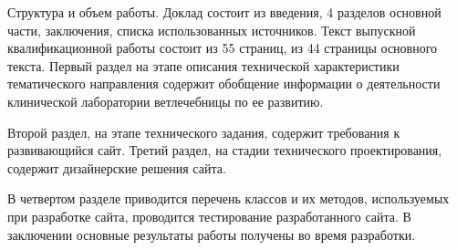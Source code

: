 Структура и объем работы. Доклад состоит из введения, 4 разделов основной части, заключения, списка использованных источников. Текст выпускной квалификационной работы состоит из 55 страниц, из 44 страницы основного текста.
Первый раздел на этапе описания технической характеристики тематического направления содержит обобщение информации о деятельности клинической лаборатории ветлечебницы по ее развитию.

Второй раздел, на этапе технического задания, содержит требования к развивающийся сайт.
Третий раздел, на стадии технического проектирования, содержит дизайнерские решения сайта.

В четвертом разделе приводится перечень классов и их методов, используемых при разработке сайта, проводится тестирование разработанного сайта.
В заключении основные результаты работы получены
во время разработки.
